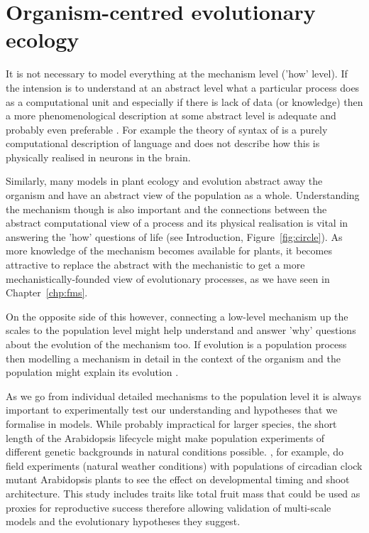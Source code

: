 


\section{Organism-centred evolutionary ecology}
It is not necessary to model everything at the mechanism level ('how' level). If
the intension is to understand at an abstract level what a particular process
does as a computational unit and especially if there is lack of data (or
knowledge) then a more phenomenological description at some abstract level is
adequate and probably even preferable \citep[see levels of description
of][Chapter 1]{marr_vision:_1982}. For example the theory of syntax of
\citet{chomsky_aspects_2014} is a purely computational description of language
and does not describe how this is physically realised in neurons in the brain.

Similarly, many models in plant ecology and evolution abstract away the organism
and have an abstract view of the population as a whole. Understanding the
mechanism though is also important and the connections between the abstract
computational view of a process and its physical realisation is vital in
answering the 'how' questions of life (see Introduction,
Figure~\ref{fig:circle}). As more knowledge of the mechanism becomes available
for plants, it becomes attractive to replace the abstract with the mechanistic to
get a more mechanistically-founded view of evolutionary processes, as we have
seen in Chapter~\ref{chp:fms}.

On the opposite side of this however, connecting a low-level mechanism up the
scales to the population level might help understand and answer 'why' questions
about the evolution of the mechanism too. If evolution is a population process
\citep{doebeli_towards_2017} then modelling a mechanism in detail in the context
of the organism and the population might explain its evolution
\citep[\enquote{Nothing in biology makes sense except in light of population
  genetics};][]{lynch_origins_2007}.

As we go from individual detailed mechanisms to the population level it is
always important to experimentally test our understanding and hypotheses that we
formalise in models. While probably impractical for larger species, the short
length of the Arabidopsis lifecycle might make population experiments of
different genetic backgrounds in natural conditions
possible. \citet{rubin_circadian_2018}, for example, do field experiments
(natural weather conditions) with populations of circadian clock mutant
Arabidopsis plants to see the effect on developmental timing and shoot
architecture. This study includes traits like total fruit mass that could be
used as proxies for reproductive success therefore allowing validation of
multi-scale models and the evolutionary hypotheses they suggest.

